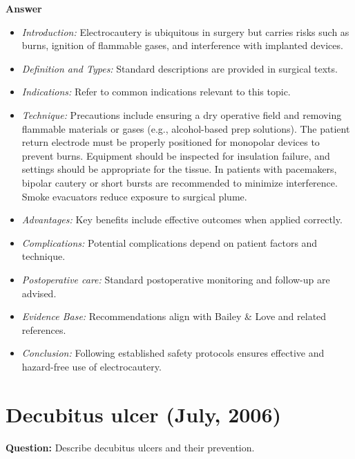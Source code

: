 \documentclass{article}
\begin{document}
\textbf{Answer}
\begin{itemize}

\item \emph{Introduction:} Electrocautery is ubiquitous in surgery but carries risks such as burns, ignition of flammable gases, and interference with implanted devices.
\item \emph{Definition and Types:} Standard descriptions are provided in surgical texts.
\item \emph{Indications:} Refer to common indications relevant to this topic.

\item \emph{Technique:} Precautions include ensuring a dry operative field and removing flammable materials or gases (e.g., alcohol-based prep solutions). The patient return electrode must be properly positioned for monopolar devices to prevent burns. Equipment should be inspected for insulation failure, and settings should be appropriate for the tissue. In patients with pacemakers, bipolar cautery or short bursts are recommended to minimize interference. Smoke evacuators reduce exposure to surgical plume.
\item \emph{Advantages:} Key benefits include effective outcomes when applied correctly.
\item \emph{Complications:} Potential complications depend on patient factors and technique.
\item \emph{Postoperative care:} Standard postoperative monitoring and follow-up are advised.
\item \emph{Evidence Base:} Recommendations align with Bailey \& Love and related references.

\item \emph{Conclusion:} Following established safety protocols ensures effective and hazard-free use of electrocautery.


\end{itemize}

\section{Decubitus ulcer (July, 2006)}

\textbf{Question:} Describe decubitus ulcers and their prevention.
\end{document}
